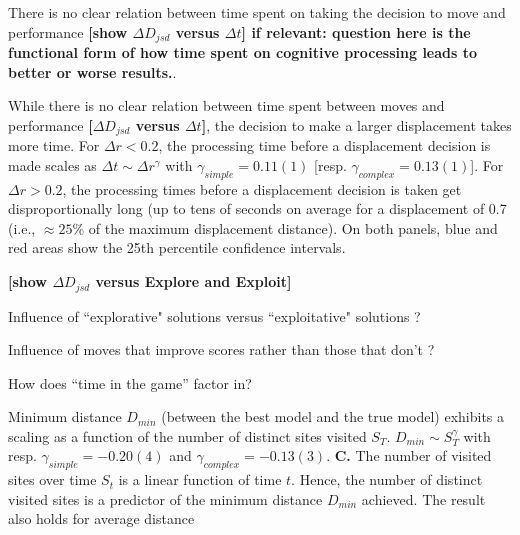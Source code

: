 There is no clear relation between time spent on taking the decision to move and performance {\bf [show $\Delta D_{jsd}$ versus $\Delta t$] if relevant: question here is the functional form of how time spent on cognitive processing leads to better or worse results.}.

While there is no clear relation between time spent between moves and performance {\bf [$\Delta D_{jsd}$ versus $\Delta t$]}, the decision to make a larger displacement takes more time. For $\Delta r < 0.2$, the processing time before a displacement decision is made scales as $\Delta t \sim \Delta r^{\gamma}$ with $\gamma_{simple} = 0.11(1)$ [resp. $\gamma_{complex} = 0.13(1)$]. For $\Delta r > 0.2$, the processing times before a displacement decision is taken get disproportionally long (up to tens of seconds on average for a displacement of 0.7 (i.e., $\approx 25\%$ of the maximum displacement distance). On both panels, blue and red areas show the 25th percentile confidence intervals.


{\bf [show $\Delta D_{jsd}$ versus Explore and Exploit]}

Influence of ``explorative" solutions versus ``exploitative" solutions ?

Influence of moves that improve scores rather than those that don't ?

How does ``time in the game'' factor in?

Minimum distance $D_{min}$ (between the best model and the true model) exhibits a scaling as a function of the number of distinct sites visited $S_{T}$. $D_{min} \sim S_{T}^{\gamma}$ with resp. $\gamma_{simple} = -0.20(4)$ and $\gamma_{complex} = - 0.13(3)$. {\bf C.} The number of visited sites over time $S_t$ is a linear function of time $t$. Hence, the number of distinct visited sites is a predictor of the minimum distance $D_{min}$ achieved. The result also holds for average distance

